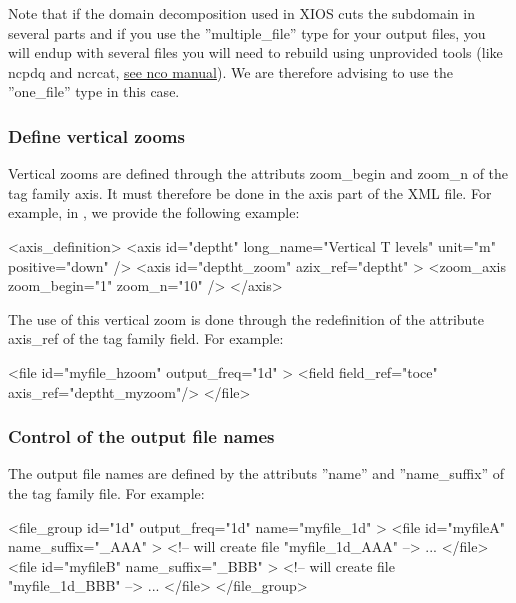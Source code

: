 \documentclass[../main/NEMO_manual]{subfiles}
\begin{document}
Note that if the domain decomposition used in XIOS cuts the subdomain in several parts and if
you use the ''multiple\_file'' type for your output files,
you will endup with several files you will need to rebuild using unprovided tools (like ncpdq and ncrcat,
\href{http://nco.sourceforge.net/nco.html#Concatenation}{see nco manual}).
We are therefore advising to use the ''one\_file'' type in this case.

\subsubsection{Define vertical zooms}

Vertical zooms are defined through the attributs zoom\_begin and zoom\_n of the tag family axis.
It must therefore be done in the axis part of the XML file.
For example, in , we provide the following example:

\begin{xmllines}
<axis_definition>
	<axis id="deptht" long_name="Vertical T levels" unit="m" positive="down" />
	<axis id="deptht_zoom" azix_ref="deptht" >
		<zoom_axis zoom_begin="1" zoom_n="10" />
	</axis>
\end{xmllines}

The use of this vertical zoom is done through the redefinition of the attribute axis\_ref of the tag family field.
For example:

\begin{xmllines}
<file id="myfile_hzoom" output_freq="1d" >
	<field field_ref="toce" axis_ref="deptht_myzoom"/>
</file>
\end{xmllines}

\subsubsection{Control of the output file names}

The output file names are defined by the attributs ''name'' and ''name\_suffix'' of the tag family file.
For example:

\begin{xmllines}
<file_group id="1d" output_freq="1d" name="myfile_1d" >
	<file id="myfileA" name_suffix="_AAA" > <!-- will create file "myfile_1d_AAA"  -->
		...
	</file>
	<file id="myfileB" name_suffix="_BBB" > <!-- will create file "myfile_1d_BBB" -->
		...
	</file>
</file_group>
\end{xmllines}
\end{document}
